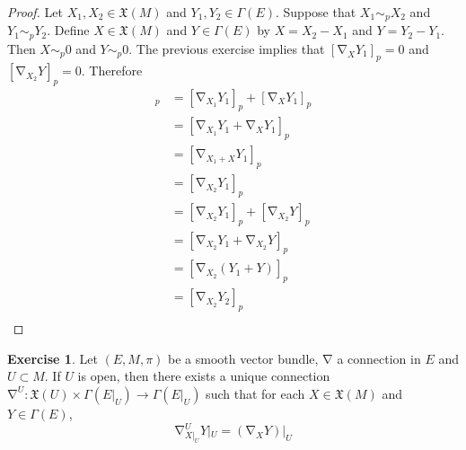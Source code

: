\documentclass{book}
\theoremstyle{definition}
\newtheorem{ex}[definition]{Exercise}
\newcommand{\Gam}{\Gamma}
\newcommand{\MFX}{\mathfrak{X}}
\DeclareMathOperator{\nab}{\nabla}
\DeclareMathOperator*{\0}{\mbf{0}}
\DeclareMathOperator*{\1}{\mbf{1}}
\begin{document}
	\begin{proof}
		Let $X_1, X_2 \in \MFX(M)$ and $Y_1, Y_2 \in \Gam(E)$. Suppose that $X_1 \sim_p X_2$ and $Y_1 \sim_p Y_2$. Define $X \in \MFX(M)$ and $Y \in \Gam(E)$ by $X = X_2 - X_1$ and $Y = Y_2 - Y_1$. Then $X \sim_p 0$ and $Y \sim_p 0$. The previous exercise implies that $[\nab_{X}Y_1]_p = 0$ and $[\nab_{X_2} Y]_p = 0$. Therefore
		\begin{align*}
			[\nab_{X_1} Y_1]_p
			& = [\nab_{X_1} Y_1]_p + [\nab_X Y_1]_p \\
			& = [\nab_{X_1} Y_1 + \nab_X Y_1]_p \\
			& = [\nab_{X_1 + X} Y_1]_p \\
			& = [\nab_{X_2} Y_1]_p \\
			& = [\nab_{X_2} Y_1]_p + [\nab_{X_2} Y]_p \\
			& = [\nab_{X_2} Y_1 + \nab_{X_2} Y]_p \\
			& = [\nab_{X_2} (Y_1 + Y)]_p \\
			& = [\nab_{X_2} Y_2]_p \\
		\end{align*}
	\end{proof}

	\begin{ex}
		Let $(E, M, \pi)$ be a smooth vector bundle, $\nab$ a connection in $E$ and $U \subset M$. If $U$ is open, then there exists a unique connection $\nab^U: \MFX(U) \times \Gam(E|_U) \rightarrow \Gam(E|_U)$ such that for each $X \in \MFX(M)$ and $Y \in \Gam(E)$, 
		$$\nab^U_{X|_U} Y|_U = (\nab_X Y)|_U$$
	\end{ex}

	
	
	
	
	
	
	
	
	
	
\end{document}
